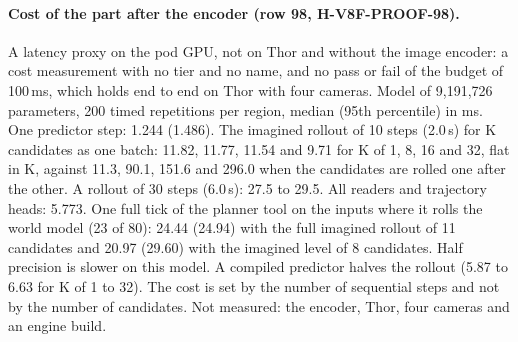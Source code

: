 \paragraph{Cost of the part after the encoder (row 98, H-V8F-PROOF-98).} A latency proxy on the pod GPU, not on Thor and without the image encoder: a cost measurement with no tier and no name, and no pass or fail of the budget of 100\,ms, which holds end to end on Thor with four cameras. Model of 9,191,726 parameters, 200 timed repetitions per region, median (95th percentile) in ms. One predictor step: 1.244 (1.486). The imagined rollout of 10 steps (2.0\,s) for K candidates as one batch: 11.82, 11.77, 11.54 and 9.71 for K of 1, 8, 16 and 32, flat in K, against 11.3, 90.1, 151.6 and 296.0 when the candidates are rolled one after the other. A rollout of 30 steps (6.0\,s): 27.5 to 29.5. All readers and trajectory heads: 5.773. One full tick of the planner tool on the inputs where it rolls the world model (23 of 80): 24.44 (24.94) with the full imagined rollout of 11 candidates and 20.97 (29.60) with the imagined level of 8 candidates. Half precision is slower on this model. A compiled predictor halves the rollout (5.87 to 6.63 for K of 1 to 32). The cost is set by the number of sequential steps and not by the number of candidates. Not measured: the encoder, Thor, four cameras and an engine build.

